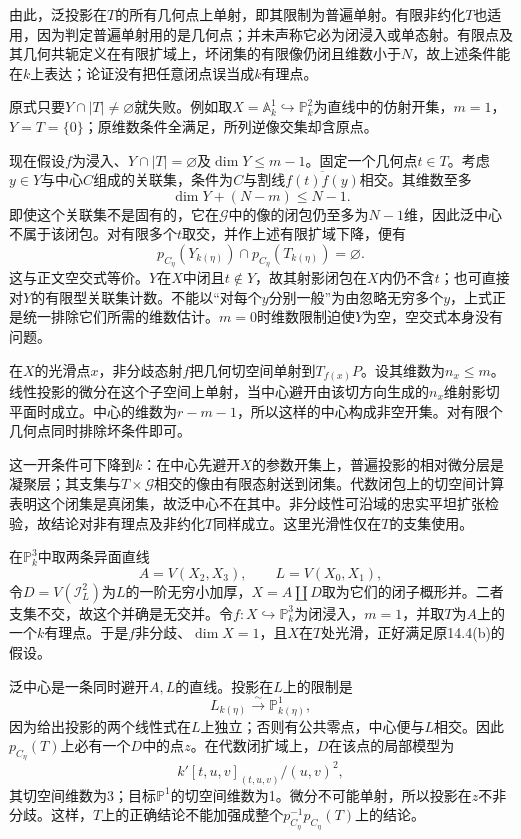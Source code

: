 由此，泛投影在$T$的所有几何点上单射，即其限制为普遍单射。有限非约化$T$也适用，因为判定普遍单射用的是几何点；并未声称它必为闭浸入或单态射。有限点及其几何共轭定义在有限扩域上，坏闭集的有限像仍闭且维数小于$N$，故上述条件能在$k$上表达；论证没有把任意闭点误当成$k$有理点。

原式只要$Y\cap|T|\ne\varnothing$就失败。例如取$X=\mathbb A^1_k\hookrightarrow\mathbb P^2_k$为直线中的仿射开集，$m=1$，$Y=T=\{0\}$；原维数条件全满足，所列逆像交集却含原点。

现在假设$f$为浸入、$Y\cap|T|=\varnothing$及$\dim Y\leq m-1$。固定一个几何点$t\in T$。考虑$y\in Y$与中心$C$组成的关联集，条件为$C$与割线$\overline{f(t)f(y)}$相交。其维数至多
\[
\dim Y+(N-m)\leq N-1.
\]
即使这个关联集不是固有的，它在$\mathcal G$中的像的闭包仍至多为$N-1$维，因此泛中心不属于该闭包。对有限多个$t$取交，并作上述有限扩域下降，便有
\[
p_{C_\eta}(Y_{k(\eta)})\cap p_{C_\eta}(T_{k(\eta)})=\varnothing.
\]
这与正文空交式等价。$Y$在$X$中闭且$t\notin Y$，故其射影闭包在$X$内仍不含$t$；也可直接对$Y$的有限型关联集计数。不能以“对每个$y$分别一般”为由忽略无穷多个$y$，上式正是统一排除它们所需的维数估计。$m=0$时维数限制迫使$Y$为空，空交式本身没有问题。

在$X$的光滑点$x$，非分歧态射$f$把几何切空间单射到$T_{f(x)}P$。设其维数为$n_x\leq m$。线性投影的微分在这个子空间上单射，当中心避开由该切方向生成的$n_x$维射影切平面时成立。中心的维数为$r-m-1$，所以这样的中心构成非空开集。对有限个几何点同时排除坏条件即可。

这一开条件可下降到$k$：在中心先避开$X$的参数开集上，普遍投影的相对微分层是凝聚层；其支集与$T\times\mathcal G$相交的像由有限态射送到闭集。代数闭包上的切空间计算表明这个闭集是真闭集，故泛中心不在其中。非分歧性可沿域的忠实平坦扩张检验，故结论对非有理点及非约化$T$同样成立。这里光滑性仅在$T$的支集使用。

在$\mathbb P^3_k$中取两条异面直线
\[
A=V(X_2,X_3),\qquad L=V(X_0,X_1),
\]
令$D=V(\mathcal I_L^2)$为$L$的一阶无穷小加厚，$X=A\amalg D$取为它们的闭子概形并。二者支集不交，故这个并确是无交并。令$f:X\hookrightarrow\mathbb P^3_k$为闭浸入，$m=1$，并取$T$为$A$上的一个$k$有理点。于是$f$非分歧、$\dim X=1$，且$X$在$T$处光滑，正好满足原14.4(b)的假设。

泛中心是一条同时避开$A,L$的直线。投影在$L$上的限制是
\[
L_{k(\eta)}\xrightarrow{\sim}\mathbb P^1_{k(\eta)},
\]
因为给出投影的两个线性式在$L$上独立；否则有公共零点，中心便与$L$相交。因此$p_{C_\eta}(T)$上必有一个$D$中的点$z$。在代数闭扩域上，$D$在该点的局部模型为
\[
k'[t,u,v]_{(t,u,v)}/(u,v)^2,
\]
其切空间维数为3；目标$\mathbb P^1$的切空间维数为1。微分不可能单射，所以投影在$z$不非分歧。这样，$T$上的正确结论不能加强成整个$p_{C_\eta}^{-1}p_{C_\eta}(T)$上的结论。

